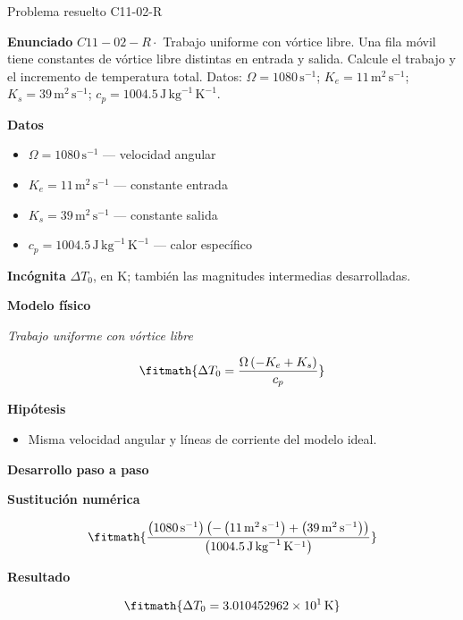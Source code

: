 \documentclass[10pt,openany]{book}
\begin{document}
\begin{studiumworked}{Problema resuelto C11-02-R}


\noindent\textbf{Enunciado}
\(C11-02-R \cdot\) Trabajo uniforme con vórtice libre. Una fila móvil tiene constantes de vórtice libre distintas en entrada y salida. Calcule el trabajo y el incremento de temperatura total. Datos: \(\Omega=1080\, \mathrm{s}^{-1}\); \(K_e=11\, \mathrm{m}^{2}\,\mathrm{s}^{-1}\); \(K_s=39\, \mathrm{m}^{2}\,\mathrm{s}^{-1}\); \(c_p=1004.5\, \mathrm{J}\,\mathrm{kg}^{-1}\,\mathrm{K}^{-1}\).

\noindent\textbf{Datos}
\begin{itemize}
\item $\Omega = 1080\,\mathrm{s}^{-1}$ — velocidad angular
\item $K_e = 11\,\mathrm{m}^{2}\,\mathrm{s}^{-1}$ — constante entrada
\item $K_s = 39\,\mathrm{m}^{2}\,\mathrm{s}^{-1}$ — constante salida
\item $c_p = 1004.5\,\mathrm{J}\,\mathrm{kg}^{-1}\,\mathrm{K}^{-1}$ — calor específico
\end{itemize}

\noindent\textbf{Incógnita}
$\Delta T_0$, en $\mathrm{K}$; también las magnitudes intermedias desarrolladas.

\noindent\textbf{Modelo físico}

\noindent\textit{Trabajo uniforme con vórtice libre}

\[
\fitmath{\Delta T_0=\frac{\Omega \left(- K_e + K_s\right)}{c_p}}
\]

\noindent\textbf{Hipótesis}
\begin{itemize}
\item Misma velocidad angular y líneas de corriente del modelo ideal.
\end{itemize}

\noindent\textbf{Desarrollo paso a paso}



\noindent\textbf{Sustitución numérica}

\[
\fitmath{\frac{\left(1080\,\mathrm{s}^{-1}\right) \left(- \left(11\,\mathrm{m}^{2}\,\mathrm{s}^{-1}\right) + \left(39\,\mathrm{m}^{2}\,\mathrm{s}^{-1}\right)\right)}{\left(1004.5\,\mathrm{J}\,\mathrm{kg}^{-1}\,\mathrm{K}^{-1}\right)}}
\]

\noindent\textbf{Resultado}

\[
\fitmath{\Delta T_0=3.010452962\times10^{1}\,\mathrm{K}}
\]


\end{studiumworked}
\end{document}
